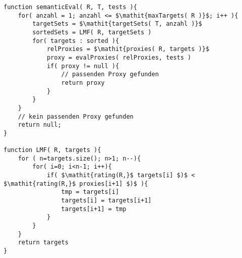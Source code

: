 \begin{lstlisting}[style = pseudo, caption=Semantische Evaluation mit Heuristik LMF, captionpos=b, label=lst_lmf]
function semanticEval( R, T, tests ){
	for( anzahl = 1; anzahl <= $\mathit{maxTargets( R )}$; i++ ){
		targetSets = $\mathit{targetSets( T, anzahl )}$
		sortedSets = LMF( R, targetSets )		
		for( targets : sorted ){
			relProxies = $\mathit{proxies( R, targets )}$
			proxy = evalProxies( relProxies, tests )	
			if( proxy != null ){
				// passenden Proxy gefunden
				return proxy
			}
		}
	}
	// kein passenden Proxy gefunden
	return null;
}

function LMF( R, targets ){
	for	( n=targets.size(); n>1; n--){
		for( i=0; i<n-1; i++){
			if( $\mathit{rating(R,}$ targets[i] $)$ < $\mathit{rating(R,}$ proxies[i+1] $)$ ){
				tmp = targets[i]
				targets[i] = targets[i+1]
				targets[i+1] = tmp
			}
		}
	}	
	return targets
}
\end{lstlisting}


